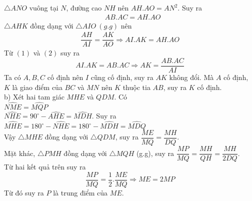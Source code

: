 \begin{ex}
{$\triangle ANO$ vuông tại $N$, đường cao $NH$ nên $AH.AO=AN^2$. Suy ra
\begin{align*}
& AB.AC=AH.AO \tag{1}
\end{align*}
$\triangle AHK$ đồng dạng với $\triangle AIO\ (g.g)$ nên
\begin{align*}
\dfrac{AH}{AI}=\dfrac{AK}{AO}\Rightarrow AI.AK=AH.AO \tag{2}
\end{align*}
Từ $(1)$ và $(2)$ suy ra $$AI.AK=AB.AC\Rightarrow AK=\dfrac{AB.AC}{AI}$$
Ta có $A, B, C$ cố định nên $I$ cũng cố định, suy ra $AK$ không đổi. Mà $A$ cố định, $K$ là giao điểm của $BC$ và $MN$ nên $K$ thuộc tia $AB$, suy ra $K$ cố định.\\
b) Xét hai tam giác $MHE$ và $QDM$. Có\\
$\widehat{NME}=\widehat{MQP}$\\
$\widehat{NHE}=90^\circ-\widehat{AHE}=\widehat{MDH}$. Suy ra $\widehat{MHE}=180^\circ-\widehat{NHE}=180^\circ-\widehat{MDH}=\widehat{MDQ}$\\
Vậy $\triangle MHE$ đồng dạng với $\triangle QDM$, suy ra $\dfrac{ME}{MQ}=\dfrac{MH}{DQ}$.\\
Mặt khác, $\triangle PMH$ đồng dạng với $\triangle MQH$ (g.g), suy ra $\dfrac{MP}{MQ}=\dfrac{MH}{QH}=\dfrac{MH}{2DQ}$.\\
Từ hai kết quả trên suy ra 
$$\dfrac{MP}{MQ}=\dfrac{1}{2}.\dfrac{ME}{MQ}\Rightarrow ME=2MP$$
Từ đó suy ra $P$ là trung điểm của $ME$.
}
\end{ex}


